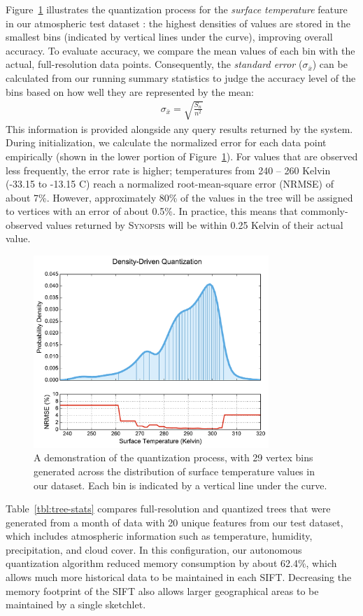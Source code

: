 Figure~\ref{fig:quantization} illustrates the quantization process for the \emph{surface temperature} feature in our atmospheric test dataset \cite{noaa_nam}: the highest densities of values are stored in the smallest bins (indicated by vertical lines under the curve), improving overall accuracy. To evaluate accuracy, we compare the mean values of each bin with the actual, full-resolution data points. Consequently, the \emph{standard error} ($\sigma_{\bar{x}}$) can be calculated from our running summary statistics to judge the accuracy level of the bins based on how well they are represented by the mean:
\begin{align*}
    \sigma_{\bar{x}} = \sqrt{\frac{S_n}{n^2}}
\end{align*}
This information is provided alongside any query results returned by the system. During initialization, we calculate the normalized error for each data point empirically (shown in the lower portion of Figure~\ref{fig:quantization}). For values that are observed less frequently, the error rate is higher; temperatures from 240 -- 260 Kelvin (-33.15 to -13.15 \degree C) reach a normalized root-mean-square error (NRMSE) of about 7\%. However, approximately 80\% of the values in the tree will be assigned to vertices with an error of about 0.5\%. In practice, this means that commonly-observed values returned by \textsc{Synopsis} will be within 0.25 Kelvin of their actual value.
%
\begin{figure}
    \centerline{\includegraphics[width=3.5in]{figures/quantization.pdf}}
    \caption{A demonstration of the quantization process, with 29 vertex bins generated across the distribution of surface temperature values in our dataset. Each bin is indicated by a vertical line under the curve.}
    \label{fig:quantization}
\end{figure}
%
Table~\ref{tbl:tree-stats} compares full-resolution and quantized trees that were generated from a month of data with 20 unique features from our test dataset, which includes atmospheric information such as temperature, humidity, precipitation, and cloud cover. In this configuration, our autonomous quantization algorithm reduced memory consumption by about 62.4\%, which allows much more historical data to be maintained in each SIFT. Decreasing the memory footprint of the SIFT also allows larger geographical areas to be maintained by a single sketchlet.

